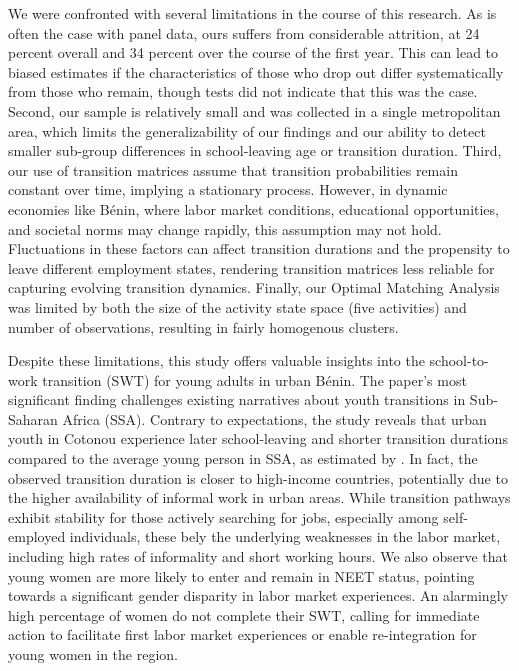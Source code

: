 \documentclass[
  a4paper, twoside, 12pt]{book}
\renewcommand{\hl}[1]{#1}
\begin{document}
\hl{We were confronted with several limitations in the course of this research. As is often the case with panel data, ours suffers from considerable attrition, at 24 percent overall and 34 percent over the course of the first year. This can lead to biased estimates if the characteristics of those who drop out differ systematically from those who remain, though tests did not indicate that this was the case. Second, our sample is relatively small and was collected in a single metropolitan area, which limits the generalizability of our findings and our ability to detect smaller sub-group differences in school-leaving age or transition duration. Third, our use of transition matrices assume that transition probabilities remain constant over time, implying a stationary process. However, in dynamic economies like Bénin, where labor market conditions, educational opportunities, and societal norms may change rapidly, this assumption may not hold. Fluctuations in these factors can affect transition durations and the propensity to leave different employment states, rendering transition matrices less reliable for capturing evolving transition dynamics. Finally, our Optimal Matching Analysis was limited by both the size of the activity state space (five activities) and number of observations, resulting in fairly homogenous clusters.}

\hl{Despite these limitations, this study offers valuable insights into the school-to-work transition (SWT) for young adults in urban Bénin. The paper's most significant finding challenges existing narratives about youth transitions in Sub-Saharan Africa (SSA). Contrary to expectations, the study reveals that urban youth in Cotonou experience later school-leaving and shorter transition durations compared to the average young person in SSA, as estimated by }\textcite{manacorda2017}.\hl{ In fact, the observed transition duration is closer to high-income countries, potentially due to the higher availability of informal work in urban areas. While transition pathways exhibit stability for those actively searching for jobs, especially among self-employed individuals, these bely the underlying weaknesses in the labor market, including high rates of informality and short working hours. We also observe that young women are more likely to enter and remain in NEET status, pointing towards a significant gender disparity in labor market experiences. An alarmingly high percentage of women do not complete their SWT, calling for immediate action to facilitate first labor market experiences or enable re-integration for young women in the region.}
\end{document}
